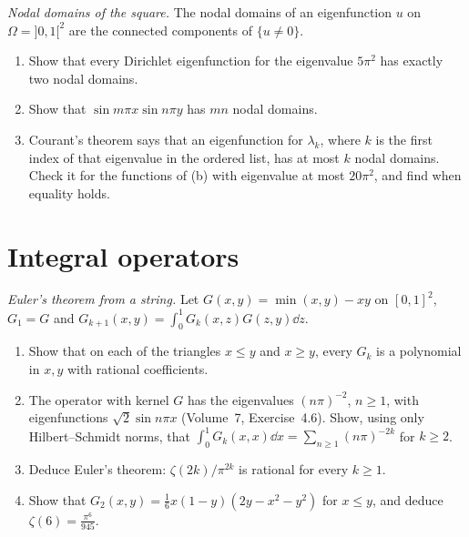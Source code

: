 \begin{exercise}[$\star$]\label{pb:nodal}
\emph{Nodal domains of the square.} The nodal domains of an eigenfunction $u$ on $\Omega=]0,1[^2$ are the connected components of $\{u\ne0\}$.
\begin{enumerate}[label=(\alph*)]
\item Show that every Dirichlet eigenfunction for the eigenvalue $5\pi^2$ has exactly two nodal domains.
\item Show that $\sin m\pi x\sin n\pi y$ has $mn$ nodal domains.
\item Courant's theorem says that an eigenfunction for $\lambda_k$, where $k$ is the first index of that eigenvalue in the ordered list, has at most $k$ nodal domains. Check it for the functions
of (b) with eigenvalue at most $20\pi^2$, and find when equality holds.
\end{enumerate}
\end{exercise}

\section{Integral operators}

\begin{exercise}[$\star\star$]\label{pb:eulerrational}
\emph{Euler's theorem from a string.} Let $G(x,y)=\min(x,y)-xy$ on $[0,1]^2$, $G_1=G$ and $G_{k+1}(x,y)=\int_0^1G_k(x,z)G(z,y)\dd z$.
\begin{enumerate}[label=(\alph*)]
\item Show that on each of the triangles $x\le y$ and $x\ge y$, every $G_k$ is a polynomial in $x,y$ with rational coefficients.
\item The operator with kernel $G$ has the eigenvalues $(n\pi)^{-2}$, $n\ge1$, with eigenfunctions $\sqrt2\sin n\pi x$ (Volume~7, Exercise~4.6). Show, using only Hilbert--Schmidt norms, that
$\int_0^1G_k(x,x)\dd x=\sum_{n\ge1}(n\pi)^{-2k}$ for $k\ge2$.
\item Deduce Euler's theorem: $\zeta(2k)/\pi^{2k}$ is rational for every $k\ge1$.
\item Show that $G_2(x,y)=\frac16x(1-y)(2y-x^2-y^2)$ for $x\le y$, and deduce $\zeta(6)=\frac{\pi^6}{945}$.
\end{enumerate}
\end{exercise}

